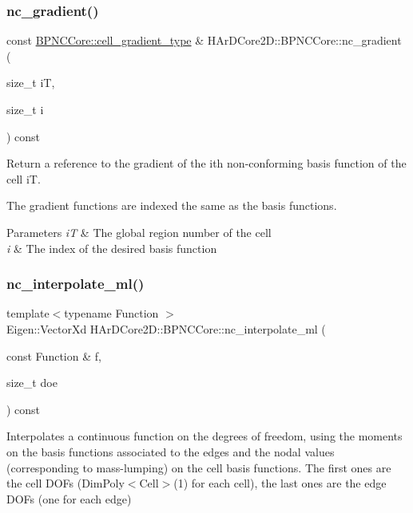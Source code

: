 \subsubsection{\texorpdfstring{nc\+\_\+gradient()}{nc\_gradient()}}
{\footnotesize\ttfamily const \hyperlink{classHArDCore2D_1_1BPNCCore_a3e1f027c19acfc768851fbdbb00f2eec}{B\+P\+N\+C\+Core\+::cell\+\_\+gradient\+\_\+type} \& H\+Ar\+D\+Core2\+D\+::\+B\+P\+N\+C\+Core\+::nc\+\_\+gradient (\begin{DoxyParamCaption}\item[{size\+\_\+t}]{iT,  }\item[{size\+\_\+t}]{i }\end{DoxyParamCaption}) const\hspace{0.3cm}{\ttfamily [inline]}}



Return a reference to the gradient of the i\textquotesingle{}th non-\/conforming basis function of the cell iT. 

The gradient functions are indexed the same as the basis functions. 
\begin{DoxyParams}{Parameters}
{\em iT} & The global region number of the cell \\
\hline
{\em i} & The index of the desired basis function \\
\hline
\end{DoxyParams}
\mbox{\label{group__BPNC_ga28d174f3526b19d85e225b9db5f9de8e}} 
\subsubsection{\texorpdfstring{nc\+\_\+interpolate\+\_\+ml()}{nc\_interpolate\_ml()}}
{\footnotesize\ttfamily template$<$typename Function $>$ \\
Eigen\+::\+Vector\+Xd H\+Ar\+D\+Core2\+D\+::\+B\+P\+N\+C\+Core\+::nc\+\_\+interpolate\+\_\+ml (\begin{DoxyParamCaption}\item[{const Function \&}]{f,  }\item[{size\+\_\+t}]{doe }\end{DoxyParamCaption}) const}



Interpolates a continuous function on the degrees of freedom, using the moments on the basis functions associated to the edges and the nodal values (corresponding to mass-\/lumping) on the cell basis functions. The first ones are the cell D\+O\+Fs (Dim\+Poly$<$\+Cell$>$(1) for each cell), the last ones are the edge D\+O\+Fs (one for each edge) 

